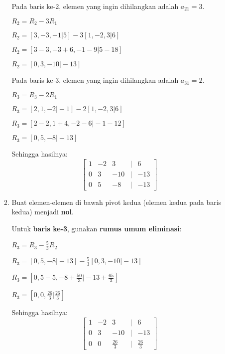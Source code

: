 \documentclass{article}
\begin{document}
\begin{enumerate}
\begin{enumerate}
\begin{enumerate}
            \vspace{1em}

            Pada baris ke-2, elemen yang ingin dihilangkan adalah \( a_{21} = 3 \).

            \(R_2 = R_2 - 3R_1\)

            \(R_2 = [3, -3, -1 \vert 5] - 3[1, -2, 3 \vert 6]\)

            \(R_2 = [3 - 3, -3 + 6, -1 - 9 \vert 5 - 18]\)

            \(R_2 = [0, 3, -10 \vert -13]\)

            \vspace{1em}
            
            Pada baris ke-3, elemen yang ingin dihilangkan adalah \( a_{31} = 2 \).

            \(R_3 = R_3 - 2R_1\)

            \(R_3 = [2, 1, -2 \vert -1] - 2[1, -2, 3 \vert 6]\)

            \(R_3 = [2 - 2, 1 + 4, -2 - 6 \vert -1 - 12]\)

            \(R_3 = [0, 5, -8 \vert -13]\)

            Sehingga hasilnya:
            \[
            \begin{bmatrix}
            1 & -2 & 3 & \vert & 6 \\
            0 & 3 & -10 & \vert & -13 \\
            0 & 5 & -8 & \vert & -13
            \end{bmatrix}
            \]

            \item Buat elemen-elemen di bawah pivot kedua (elemen kedua pada baris kedua) menjadi \textbf{nol}.
            
            \vspace{1em}

            Untuk \textbf{baris ke-3}, gunakan \textbf{rumus umum eliminasi}:

            \(R_3 = R_3 - \frac{5}{3}R_2\)

            \(R_3 = [0, 5, -8 \vert -13] - \frac{5}{3}[0, 3, -10 \vert -13]\)

            \(R_3 = [0, 5 - 5, -8 + \frac{50}{3} \vert -13 + \frac{65}{3}]\)

            \(R_3 = [0, 0, \frac{26}{3} \vert \frac{26}{3}]\)

            Sehingga hasilnya:
            \[
            \begin{bmatrix}
            1 & -2 & 3 & \vert & 6 \\
            0 & 3 & -10 & \vert & -13 \\
            0 & 0 & \frac{26}{3} & \vert & \frac{26}{3}
            \end{bmatrix}
            \]
        \end{enumerate}


\end{enumerate}
\end{enumerate}
\end{document}
